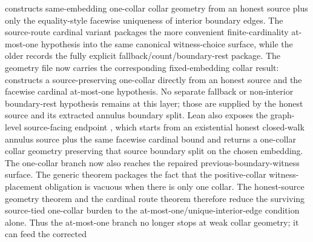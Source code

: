 \documentclass[11pt]{article}
\begin{document}
constructs same-embedding one-collar collar geometry from an honest source plus
only the equality-style facewise uniqueness of interior boundary edges.  The
source-route cardinal variant
packages the more convenient finite-cardinality at-most-one hypothesis into the
same canonical witness-choice surface, while the older
records the fully explicit fallback/count/boundary-rest package.
The geometry file now carries the corresponding fixed-embedding collar result:
constructs a source-preserving one-collar
 directly from an honest source and
the facewise cardinal at-most-one hypothesis.  No separate fallback or
non-interior boundary-rest hypothesis remains at this layer; those are supplied
by the honest source and its extracted annulus boundary split.  Lean also
exposes the graph-level source-facing endpoint
,
which starts from an existential honest closed-walk annulus source plus the same
facewise cardinal bound and returns a one-collar collar geometry preserving that
source boundary split on the chosen embedding.
The one-collar branch now also reaches the repaired
previous-boundary-witness surface.  The generic theorem
packages the fact that the positive-collar witness-placement obligation is
vacuous when there is only one collar.  The honest-source geometry theorem
and the cardinal route theorem
therefore reduce the surviving source-tied one-collar burden to the
at-most-one/unique-interior-edge condition alone.  Thus the at-most-one branch
no longer stops at weak collar geometry; it can feed the corrected
\end{document}
